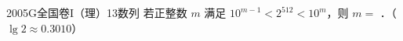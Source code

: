 
\begin{problem}{2005}{G}{全国卷I（理）}{13}{数列}
若正整数 $ m $ 满足 $ 10^{m-1}<2^{512}<10^m $，则 $ m= $ \underline{\hspace{4em}}．（$ \lg 2\approx 0.3010 $）
\end{problem}

\begin{answer}

\end{answer}

\begin{solutions}

\end{solutions}
